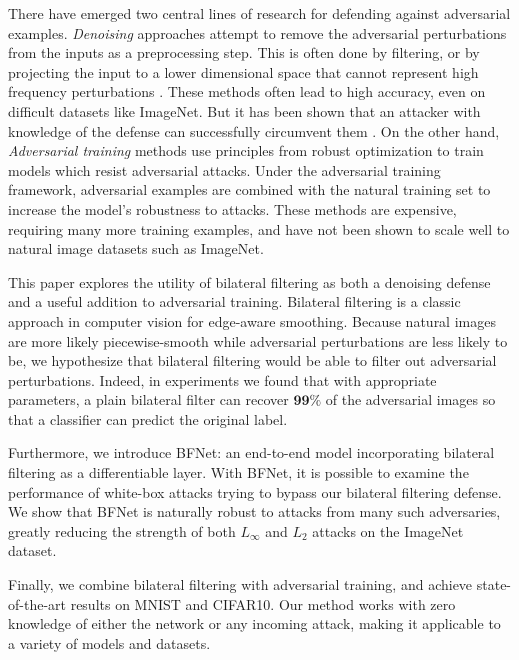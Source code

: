 \documentclass{article} %
\begin{document}
There have emerged two central lines of research for defending against adversarial examples. \textit{Denoising} approaches attempt to remove the adversarial perturbations from the inputs as a preprocessing step. This is often done by filtering, or by projecting the input to a lower dimensional space that cannot represent high frequency perturbations \citep{samangouei2018defense,shen2017ape}. These methods often lead to high accuracy, even on difficult datasets like ImageNet. But it has been shown that an attacker with knowledge of the defense can successfully circumvent them \citep{athalye2018obfuscated}. On the other hand, \textit{Adversarial training} methods use principles from robust optimization to train models which resist adversarial attacks. Under the adversarial training framework, adversarial examples are combined with the natural training set to increase the model's robustness to attacks. These methods are expensive, requiring many more training examples, and have not been shown to scale well to natural image datasets such as ImageNet. 

This paper explores the utility of bilateral filtering as both a denoising defense and a useful addition to adversarial training. Bilateral filtering is a classic approach in computer vision for edge-aware smoothing. Because natural images are more likely piecewise-smooth while adversarial perturbations are less likely to be, we hypothesize that bilateral filtering would be able to filter out adversarial perturbations. Indeed, in experiments we found that with appropriate parameters, a plain bilateral filter can recover $\textbf{99\%}$ of the adversarial images so that a classifier can predict the original label. 

Furthermore, we introduce BFNet: an end-to-end model incorporating bilateral filtering as a differentiable layer. With BFNet, it is possible to examine the performance of white-box attacks trying to bypass our bilateral filtering defense. We show that BFNet is naturally robust to attacks from many such adversaries, greatly reducing the strength of both $L_\infty$ and $L_2$ attacks on the ImageNet dataset.

Finally, we combine bilateral filtering with adversarial training, and achieve state-of-the-art results on MNIST and CIFAR10. Our method works with zero knowledge of either the network or any incoming attack, making it applicable to a variety of models and datasets. %
\end{document}
